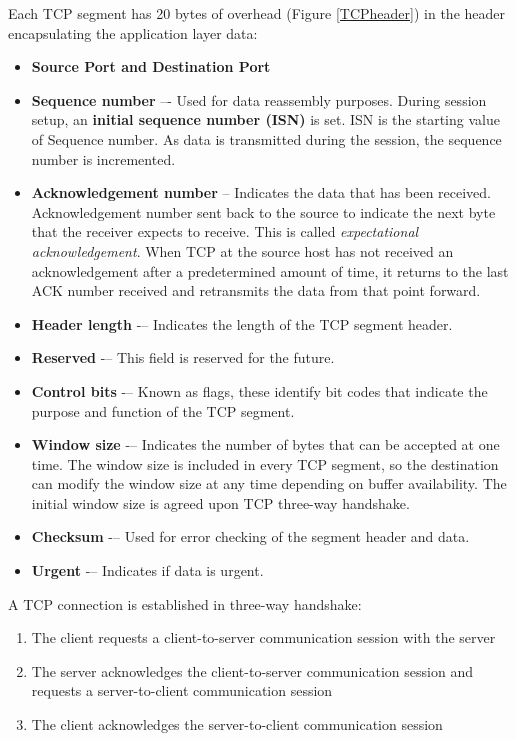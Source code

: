 Each TCP segment has 20 bytes of overhead (Figure \ref{TCPheader}) in the header encapsulating the application layer data:

\begin{itemize}
\item \textbf{Source Port and Destination Port}

\item \textbf{Sequence number} –- Used for data reassembly purposes. During session setup, an \textbf{initial sequence number (ISN)} is set. ISN is the starting value of Sequence number. As data is transmitted during the session, the sequence number is incremented. 

\item \textbf{Acknowledgement number} – Indicates the data that has been received. Acknowledgement number sent back to the source to indicate the next byte that the receiver expects to receive. This is called \emph{expectational acknowledgement}. When TCP at the source host has not received an acknowledgement after a predetermined amount of time, it returns to the last ACK number received and retransmits the data from that point forward. 

\item \textbf{Header length} -– Indicates the length of the TCP segment header.
\item \textbf{Reserved} -– This field is reserved for the future.
\item \textbf{Control bits} -– Known as flags, these identify bit codes that indicate the purpose and function of the TCP segment.
\item \textbf{Window size} -– Indicates the number of bytes that can be accepted at one time. The window size is included in every TCP segment, so the destination can modify the window size at any time depending on buffer availability. The initial window size is agreed upon  TCP three-way handshake. 
\item \textbf{Checksum} -– Used for error checking of the segment header and data.
\item \textbf{Urgent} -– Indicates if data is urgent.
\end{itemize}

A TCP connection is established in three-way handshake:

\begin{enumerate}
\item The client requests a client-to-server communication session with the server
\item The server acknowledges the client-to-server communication session and requests a server-to-client communication session
\item The client acknowledges the server-to-client communication session 
\end{enumerate}

